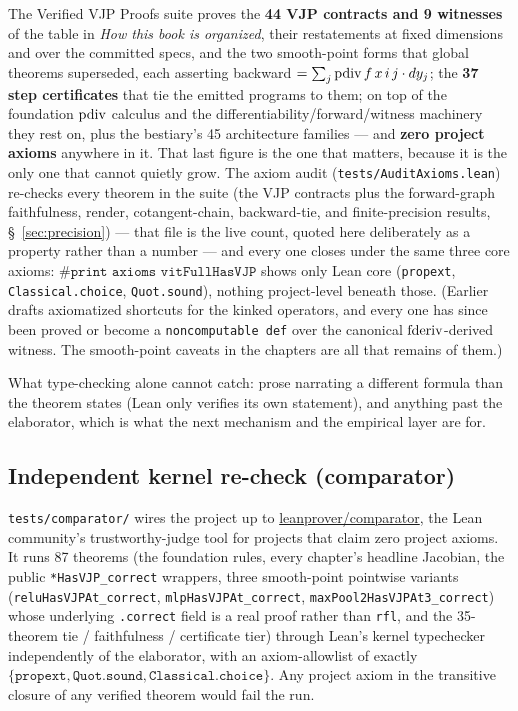 The Verified VJP Proofs suite proves the \textbf{44 VJP contracts and
9 witnesses} of the table in \emph{How this book is organized}, their
restatements at fixed dimensions and over the committed specs, and the
two smooth-point forms that global theorems superseded, each asserting
backward \(= \sum_j \operatorname{pdiv} f\,x\,i\,j \cdot dy_j\); the
\textbf{37 step certificates} that tie the emitted programs to them; on
top of the foundation \(\operatorname{pdiv}\) calculus and the
differentiability/forward/witness machinery they rest on, plus the
bestiary's 45 architecture families --- and \textbf{zero project
axioms} anywhere in it. That last figure is the one that matters, because
it is the only one that cannot quietly grow. The axiom audit
(\texttt{tests/AuditAxioms.lean}) re-checks every theorem in the
suite (the VJP contracts plus the forward-graph faithfulness, render,
cotangent-chain, backward-tie, and finite-precision results,
\S~\ref{sec:precision}) --- that file is the live count, quoted here
deliberately as a property rather than a number --- and every one closes
under the same three core axioms: \(\texttt{\#print axioms vitFullHasVJP}\) shows only
Lean core (\texttt{propext}, \texttt{Classical.choice},
\texttt{Quot.sound}), nothing project-level beneath those. (Earlier
drafts axiomatized shortcuts for the kinked operators, and every one has
since been proved or become a \texttt{noncomputable def} over the
canonical \(\operatorname{fderiv}\)-derived witness. The smooth-point caveats in
the chapters are all that remains of them.)

What type-checking alone cannot catch: prose narrating a different
formula than the theorem states (Lean only verifies its own statement),
and anything past the elaborator, which is what the next mechanism
and the empirical layer are for.

\subsection{Independent kernel re-check (comparator)}

\texttt{tests/comparator/} wires the project up to
\href{https://github.com/leanprover/comparator}{leanprover/comparator},
the Lean community's trustworthy-judge tool for projects that claim
zero project axioms. It runs 87 theorems (the foundation rules,
every chapter's headline Jacobian, the public
\texttt{*HasVJP\_correct} wrappers, three smooth-point
pointwise variants (\texttt{reluHasVJPAt\_correct},
\texttt{mlpHasVJPAt\_correct},
\texttt{maxPool2HasVJPAt3\_correct}) whose underlying
\texttt{.correct} field is a real proof rather than \texttt{rfl},
and the 35-theorem tie / faithfulness / certificate tier)
through Lean's kernel typechecker independently of the elaborator,
with an axiom-allowlist of exactly \(\{\texttt{propext},
\texttt{Quot.sound}, \texttt{Classical.choice}\}\). Any project
axiom in the transitive closure of any verified theorem would fail
the run.

